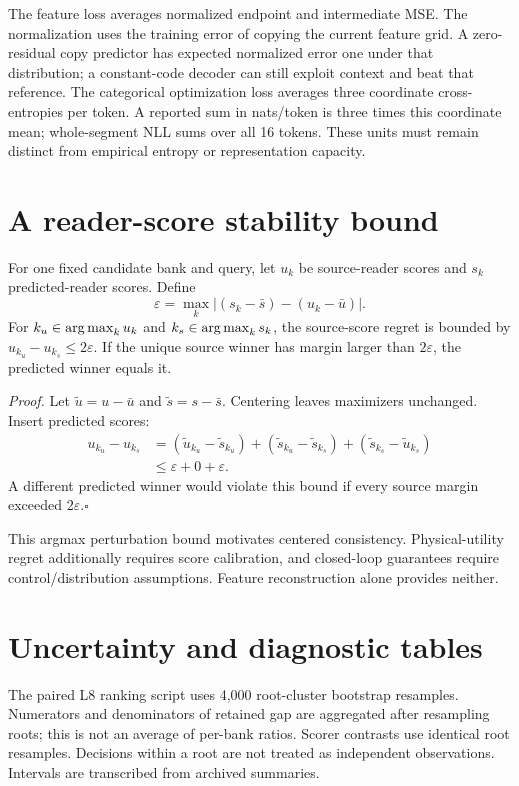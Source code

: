 \documentclass[10pt,twocolumn,letterpaper]{article}
\begin{document}
The feature loss averages normalized endpoint and intermediate MSE. The normalization uses the training error of copying the current feature grid. A zero-residual copy predictor has expected normalized error one under that distribution; a constant-code decoder can still exploit context and beat that reference. The categorical optimization loss averages three coordinate cross-entropies per token. A reported sum in nats/token is three times this coordinate mean; whole-segment NLL sums over all 16 tokens. These units must remain distinct from empirical entropy or representation capacity.

\section{A reader-score stability bound}
\begin{proposition}
For one fixed candidate bank and query, let $u_k$ be source-reader scores and $s_k$ predicted-reader scores. Define
\[
\varepsilon=\max_k|(s_k-\bar s)-(u_k-\bar u)|.
\]
For $k_u\in\operatorname*{arg\,max}_k u_k$ and $k_s\in\operatorname*{arg\,max}_k s_k$, the source-score regret is bounded by $u_{k_u}-u_{k_s}\le2\varepsilon$. If the unique source winner has margin larger than $2\varepsilon$, the predicted winner equals it.
\end{proposition}
\noindent\textit{Proof.} Let $\tilde u=u-\bar u$ and $\tilde s=s-\bar s$. Centering leaves maximizers unchanged. Insert predicted scores:
\begin{align*}
u_{k_u}-u_{k_s}
&=(\tilde u_{k_u}-\tilde s_{k_u})
 +(\tilde s_{k_u}-\tilde s_{k_s})
 +(\tilde s_{k_s}-\tilde u_{k_s})\\
&\le\varepsilon+0+\varepsilon.
\end{align*}
A different predicted winner would violate this bound if every source margin exceeded $2\varepsilon$.\hfill$\square$

This argmax perturbation bound motivates centered consistency. Physical-utility regret additionally requires score calibration, and closed-loop guarantees require control/distribution assumptions. Feature reconstruction alone provides neither.

\section{Uncertainty and diagnostic tables}
The paired L8 ranking script uses 4,000 root-cluster bootstrap resamples. Numerators and denominators of retained gap are aggregated after resampling roots; this is not an average of per-bank ratios. Scorer contrasts use identical root resamples. Decisions within a root are not treated as independent observations. Intervals are transcribed from archived summaries.
\end{document}
